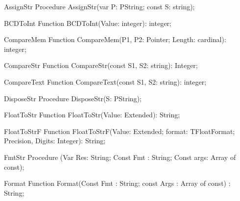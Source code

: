  
\begin{procedure}{AssignStr}
\Declaration
Procedure AssignStr(var P: PString; const S: string);
\Description
\Errors
\SeeAlso
\end{procedure}

 
\begin{function}{BCDToInt}
\Declaration
Function BCDToInt(Value: integer): integer;
\Description
\Errors
\SeeAlso
\end{function}

 
\begin{function}{CompareMem}
\Declaration
Function CompareMem(P1, P2: Pointer; Length: cardinal): integer;
\Description
\Errors
\SeeAlso
\end{function}

 
\begin{function}{CompareStr}
\Declaration
Function CompareStr(const S1, S2: string): Integer;
\Description
\Errors
\SeeAlso
\end{function}

 
\begin{function}{CompareText}
\Declaration
Function CompareText(const S1, S2: string): integer;
\Description
\Errors
\SeeAlso
\end{function}

 
\begin{procedure}{DisposeStr}
\Declaration
Procedure DisposeStr(S: PString);
\Description
\Errors
\SeeAlso
\end{procedure}

 
\begin{function}{FloatToStr}
\Declaration
Function FloatToStr(Value: Extended): String;
\Description
\Errors
\SeeAlso
\end{function}

 
\begin{function}{FloatToStrF}
\Declaration
Function FloatToStrF(Value: Extended; format: TFloatFormat; Precision, Digits: Integer): String;
\Description
\Errors
\SeeAlso
\end{function}

 
\begin{procedure}{FmtStr}
\Declaration
Procedure (Var Res: String; Const Fmt : String; Const args: Array of const);
\Description
\Errors
\SeeAlso
\end{procedure}

 
\begin{function}{Format}
\Declaration
Function Format(Const Fmt : String; const Args : Array of const) : String;
\Description
\Errors
\SeeAlso
\end{function}

